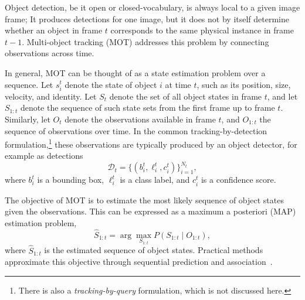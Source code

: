 

Object detection, be it open or closed-vocabulary, is always local to a given image frame; It produces detections for one image, but it does not by itself determine whether an object in frame \(t\) corresponds to the same physical instance in frame \(t-1\). Multi-object tracking (MOT) addresses this problem by connecting observations across time.

In general, MOT can be thought of as a state estimation problem over a sequence. Let \(s_i^t\) denote the state of object \(i\) at time \(t\), such as its position, size, velocity, and identity.
Let \(S_t\) denote the set of all object states in frame \(t\), and let \(S_{1:t}\) denote the sequence of such state sets from the first frame up to frame \(t\). Similarly, let \(O_t\) denote the observations available in frame \(t\), and \(O_{1:t}\) the sequence of observations over time. In the common tracking-by-detection formulation,\footnote{There is also a \emph{tracking-by-query} formulation, which is not discussed here.} these observations are typically produced by an object detector, for example as detections
\[
\mathcal{D}_t = \{(b_i^t, \ell_i^t, c_i^t)\}_{i=1}^{N_t},
\]
where \(b_i^t\) is a bounding box, \(\ell_i^t\) is a class label, and \(c_i^t\) is a confidence score.

The objective of MOT is to estimate the most likely sequence of object states given the observations. This can be expressed as a maximum a posteriori (MAP) estimation problem,
\[
\hat{S}_{1:t} = \arg\max_{S_{1:t}} P(S_{1:t} \mid O_{1:t}),
\]
where \(\hat{S}_{1:t}\) is the estimated sequence of object states. Practical methods approximate this objective through sequential prediction and association~\cite{luo_multiple_2021}. %


